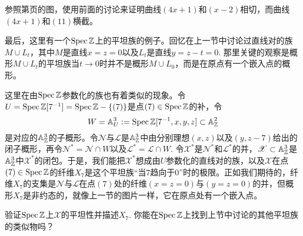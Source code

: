 \begin{exe}\label{exe:2.44}
参照第\pageref{p:2.18}页的图，使用前面的讨论来证明曲线$(4x + 1)$和$(x-2)$相切，而曲线$(4x + 1)$和$(11)$横截。
\end{exe}

最后，这里有一个$\operatorname{Spec} \mathbb{Z}$上的平坦族的例子。回忆在上一节中讨论过直线对的族$M\cup L_t$，其中$M$是直线$x=z=0$以及$L_t$是直线$y=z-t=0$. 那里关键的观察是概形$M\cup L_t$的平坦族当$t\to 0$时并不是概形$M\cup L_0$，而是在原点有一个嵌入点的概形。

这里在由$\operatorname{Spec} \mathbb{Z}$参数化的族也有着类似的现象。令$U=\operatorname{Spec} \mathbb{Z}[7^{-1}]=\operatorname{Spec} \mathbb{Z}-\{(7)\}$是点$(7)\in\operatorname{Spec}\mathbb{Z}$的补，令
\[
	W=\mathbb{A}_U^3:=\operatorname{Spec} \mathbb{Z}[7^{-1},x,y,z]\subset \mathbb{A}_{\mathbb{Z}}^2
\]
是对应的$\mathbb{A}_{\mathbb{Z}}^3$的子概形。令$\mathscr{N}$与$\mathscr{L}$是$\mathbb{A}_{\mathbb{Z}}^3$中由分别理想$(x,z)$以及$(y,z-7)$给出的闭子概形，再令$\mathscr{N}^*=\mathscr{N}\cap W$以及$\mathscr{L}^*=\mathscr{L}\cap W$. 令$\mathscr{X}^*$是$\mathscr{N}^*$和$\mathscr{L}^*$的并，$\mathscr{X}\subset \mathbb{A}_{\mathbb{Z}}^3$是$\mathbb{A}_{\mathbb{Z}}^3$中$\mathscr{X}^*$的闭包。于是，我们能把$\mathscr{X}^*$想成由$U$参数化的直线对的族，以及$\mathscr{X}$在点$(7)\in\operatorname{Spec} \mathbb{Z}$的纤维$X_7$是这个平坦族“当$7$趋向于$0$”时的极限。正如我们期待的，纤维$X_7$的支集是$\mathscr{N}$与$\mathscr{L}$在点$(7)$处的纤维$(x=z=0)$与$(y=z=0)$的并，但概形$X_7$是非约态的，就像上一节的图片一样，它在原点处有一个嵌入点。

\begin{exe}
验证$\operatorname{Spec}\mathbb{Z}$上$\mathscr{X}$的平坦性并描述$X_7$. 你能在$\operatorname{Spec}\mathbb{Z}$上找到上节中讨论的其他平坦族的类似物吗？
\end{exe}